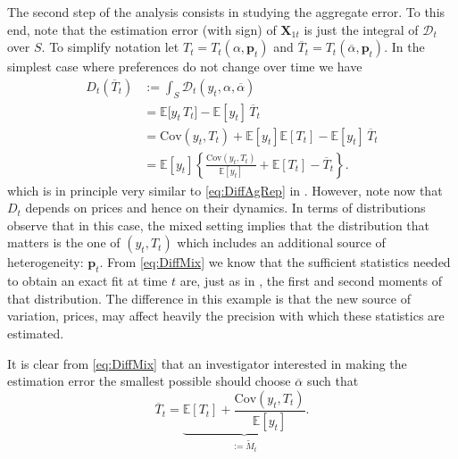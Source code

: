 \documentclass[english, a4paper, 12pt]{article}
\begin{document}
The second step of the analysis consists in studying the aggregate error. To this end, note that the estimation error (with sign) of $\mathbf{X}_{1t}$ is just the integral of $\mathcal{D}_{t}$ over $S$. To simplify notation let $T_{t} = T_{t}(\alpha , \mathbf{p}_{t})$ and $\overline{T}_{t} = T_{t}(\overline{\alpha}, \mathbf{p}_{t})$. In the simplest case where preferences do not change over time we have
	\begin{equation} \label{eq:DiffMix}
	\begin{aligned} 
		D_{t}\left(\overline{T}_{t}\right)
			&:=	\int_{S} \mathcal{D}_{t}(y_{t},\alpha,\overline{\alpha})	\\
			&=	\mathbb{E}\big[y_{t} \, T_{t}\big] - \mathbb{E}[y_{t}]\, \overline{T}_{t}		\\
			&=	\mathrm{Cov}\left(y_{t}, T_{t} \right) + \mathbb{E}[y_{t}]\mathbb{E}\left[T_{t}\right] - \mathbb{E}[y_{t}]\, \overline{T}_{t}	\\
			&= 	\mathbb{E}[y_{t}]\left\{ \frac{\mathrm{Cov}\left(y_{t}, T_{t} \right)}{\mathbb{E}[y_{t}]} + \mathbb{E}\left[T_{t}\right] - \overline{T}_{t} \right\}.
	\end{aligned}
	\end{equation}
which is in principle very similar to \eqref{eq:DiffAgRep} in . However, note now that $D_{t}$ depends on prices and hence on their dynamics. In terms of distributions observe that in this case, the mixed setting implies that the distribution that matters is the one of $(y_{t},T_{t})$ which includes an additional source of heterogeneity: $\mathbf{p}_{t}$. From \eqref{eq:DiffMix} we know that the sufficient statistics needed to obtain an exact fit at time $t$ are, just as in , the first and second moments of that distribution. The difference in this example is that the new source of variation, prices, may affect heavily the precision with which these statistics are estimated.

It is clear from \eqref{eq:DiffMix} that an investigator interested in making the estimation error the smallest possible should choose $\overline{\alpha}$ such that
	\begin{equation} \label{eq:OptT}
		\overline{T}_{t} =  \underbrace{\mathbb{E}\left[T_{t} \right] + \frac{\mathrm{Cov}\left(y_{t}, T_{t} \right)}{\mathbb{E}[y_{t}]}}_{:= \tilde{M}_{t}}.
	\end{equation}
\end{document}
